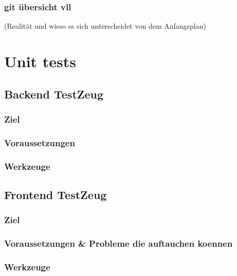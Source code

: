 \documentclass[parskip=full,11pt,twoside]{scrartcl}
\begin{document}
\subsubsection{git übersicht vll}
 (Realität und wieso es sich unterscheidet von dem Anfangsplan)
\newpage

\section{Unit tests}
\subsection{Backend TestZeug}
\subsubsection{Ziel}
\subsubsection{Voraussetzungen}
\subsubsection{Werkzeuge}
\subsection{Frontend TestZeug}
\subsubsection{Ziel}
\subsubsection{Voraussetzungen \& Probleme die auftauchen koennen}
\subsubsection{Werkzeuge}
\newpage
\end{document}
